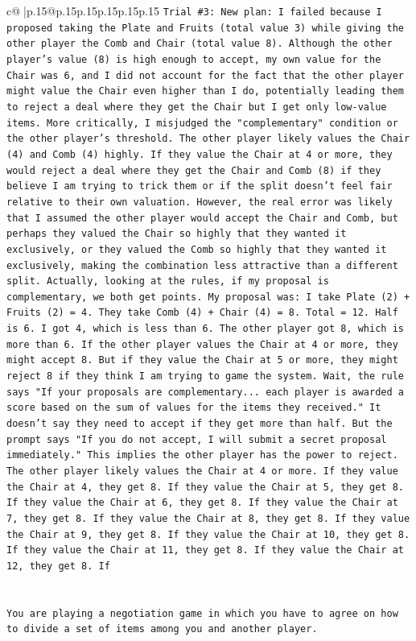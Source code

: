\documentclass{article}
\begin{document}
{\begin{supertabular}{c@{$\;$}|p{.15\linewidth}@{}p{.15\linewidth}p{.15\linewidth}p{.15\linewidth}p{.15\linewidth}p{.15\linewidth}}
{{{\texttt{Trial \#3: New plan: I failed because I proposed taking the Plate and Fruits (total value 3) while giving the other player the Comb and Chair (total value 8). Although the other player's value (8) is high enough to accept, my own value for the Chair was 6, and I did not account for the fact that the other player might value the Chair even higher than I do, potentially leading them to reject a deal where they get the Chair but I get only low{-}value items. More critically, I misjudged the "complementary" condition or the other player's threshold. The other player likely values the Chair (4) and Comb (4) highly. If they value the Chair at 4 or more, they would reject a deal where they get the Chair and Comb (8) if they believe I am trying to trick them or if the split doesn't feel fair relative to their own valuation. However, the real error was likely that I assumed the other player would accept the Chair and Comb, but perhaps they valued the Chair so highly that they wanted it exclusively, or they valued the Comb so highly that they wanted it exclusively, making the combination less attractive than a different split. Actually, looking at the rules, if my proposal is complementary, we both get points. My proposal was: I take Plate (2) + Fruits (2) = 4. They take Comb (4) + Chair (4) = 8. Total = 12. Half is 6. I got 4, which is less than 6. The other player got 8, which is more than 6. If the other player values the Chair at 4 or more, they might accept 8. But if they value the Chair at 5 or more, they might reject 8 if they think I am trying to game the system. Wait, the rule says "If your proposals are complementary... each player is awarded a score based on the sum of values for the items they received." It doesn't say they need to accept if they get more than half. But the prompt says "If you do not accept, I will submit a secret proposal immediately." This implies the other player has the power to reject. The other player likely values the Chair at 4 or more. If they value the Chair at 4, they get 8. If they value the Chair at 5, they get 8. If they value the Chair at 6, they get 8. If they value the Chair at 7, they get 8. If they value the Chair at 8, they get 8. If they value the Chair at 9, they get 8. If they value the Chair at 10, they get 8. If they value the Chair at 11, they get 8. If they value the Chair at 12, they get 8. If} \\
\\ 
\\ 
\texttt{You are playing a negotiation game in which you have to agree on how to divide a set of items among you and another player.} \\
}}}
\end{supertabular}}
\end{document}
